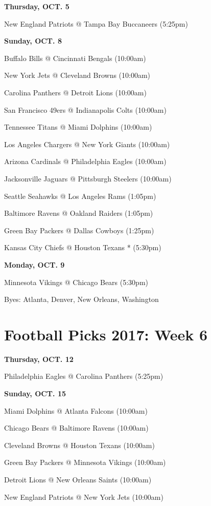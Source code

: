 \documentclass[11pt, letterpaper]{article}
\begin{document}
\noindent \normalsize \textbf{Thursday, OCT. 5} \par
New England Patriots @ Tampa Bay Buccaneers (5:25pm)\par
\noindent \normalsize \textbf{Sunday, OCT. 8} \par
Buffalo Bills @ Cincinnati Bengals (10:00am)\par
New York Jets @ Cleveland Browns (10:00am)\par
Carolina Panthers @ Detroit Lions (10:00am)\par
San Francisco 49ers @ Indianapolis Colts (10:00am)\par
Tennessee Titans @ Miami Dolphins (10:00am)\par
Los Angeles Chargers @ New York Giants (10:00am)\par
Arizona Cardinals @ Philadelphia Eagles (10:00am)\par
Jacksonville Jaguars @ Pittsburgh Steelers (10:00am)\par
Seattle Seahawks @ Los Angeles Rams (1:05pm)\par
Baltimore Ravens @ Oakland Raiders (1:05pm)\par
Green Bay Packers @ Dallas Cowboys (1:25pm)\par
Kansas City Chiefs @ Houston Texans * (5:30pm)\par
\noindent \normalsize \textbf{Monday, OCT. 9} \par
Minnesota Vikings @ Chicago Bears (5:30pm)\par
\vfill{}
Byes:  Atlanta,  Denver,  New Orleans, 
                      Washington
\newpage \section*{\LARGE Football Picks 2017: Week 6}
\noindent \normalsize \textbf{Thursday, OCT.    12} \par
Philadelphia Eagles @ Carolina Panthers (5:25pm)\par
\noindent \normalsize \textbf{Sunday, OCT. 15} \par
Miami Dolphins @ Atlanta Falcons (10:00am)\par
Chicago Bears @ Baltimore Ravens (10:00am)\par
Cleveland Browns @ Houston Texans (10:00am)\par
Green Bay Packers @ Minnesota Vikings (10:00am)\par
Detroit Lions @ New Orleans Saints (10:00am)\par
New England Patriots @ New York Jets (10:00am)\par
\end{document}
